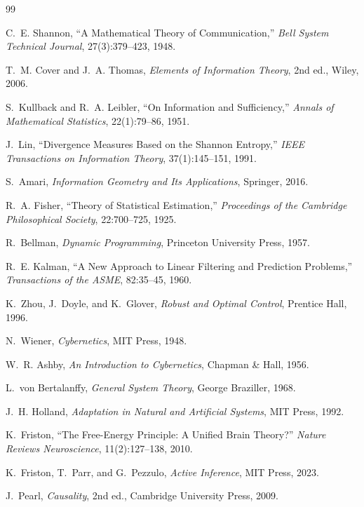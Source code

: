 \documentclass[12pt,a4paper]{article}
\begin{document}
\begin{thebibliography}{99}

C.~E. Shannon, ``A Mathematical Theory of Communication,'' \textit{Bell System Technical Journal}, 27(3):379--423, 1948.

T.~M. Cover and J.~A. Thomas, \textit{Elements of Information Theory}, 2nd ed., Wiley, 2006.

S.~Kullback and R.~A. Leibler, ``On Information and Sufficiency,'' \textit{Annals of Mathematical Statistics}, 22(1):79--86, 1951.

J.~Lin, ``Divergence Measures Based on the Shannon Entropy,'' \textit{IEEE Transactions on Information Theory}, 37(1):145--151, 1991.

S.~Amari, \textit{Information Geometry and Its Applications}, Springer, 2016.

R.~A. Fisher, ``Theory of Statistical Estimation,'' \textit{Proceedings of the Cambridge Philosophical Society}, 22:700--725, 1925.

R.~Bellman, \textit{Dynamic Programming}, Princeton University Press, 1957.

R.~E. Kalman, ``A New Approach to Linear Filtering and Prediction Problems,'' \textit{Transactions of the ASME}, 82:35--45, 1960.

K.~Zhou, J.~Doyle, and K.~Glover, \textit{Robust and Optimal Control}, Prentice Hall, 1996.

N.~Wiener, \textit{Cybernetics}, MIT Press, 1948.

W.~R. Ashby, \textit{An Introduction to Cybernetics}, Chapman \& Hall, 1956.

L.~von Bertalanffy, \textit{General System Theory}, George Braziller, 1968.

J.~H. Holland, \textit{Adaptation in Natural and Artificial Systems}, MIT Press, 1992.

K.~Friston, ``The Free-Energy Principle: A Unified Brain Theory?'' \textit{Nature Reviews Neuroscience}, 11(2):127--138, 2010.

K.~Friston, T.~Parr, and G.~Pezzulo, \textit{Active Inference}, MIT Press, 2023.

J.~Pearl, \textit{Causality}, 2nd ed., Cambridge University Press, 2009.


\end{thebibliography}
\end{document}

